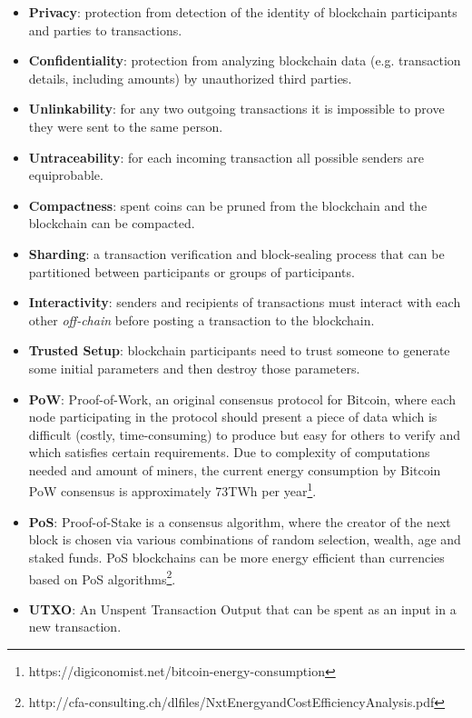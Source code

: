 \documentclass[8pt,fleqn,openany]{book}
\begin{document}
\begin{itemize}
  \item \textbf{Privacy}: protection from detection of the identity of blockchain participants and parties to transactions.
  \item \textbf{Confidentiality}: protection from analyzing blockchain data (e.g. transaction details, including amounts) by unauthorized third parties.
  \item \textbf{Unlinkability}: for any two outgoing transactions it is impossible to prove they were sent to the same person\cite{c2}.
  \item \textbf{Untraceability}: for each incoming transaction all possible senders are equiprobable\cite{c2}.
  \item \textbf{Compactness}: spent coins can be pruned from the blockchain and the blockchain can be compacted.
  \item \textbf{Sharding}: a transaction verification and block-sealing process that can be partitioned between participants or groups of participants.
  \item \textbf{Interactivity}: senders and recipients of transactions must interact with each other \textit{off-chain} before posting a transaction to the blockchain.
  \item \textbf{Trusted Setup}: blockchain participants need to trust someone to generate some initial parameters and then destroy those parameters.
  \item \textbf{PoW}: Proof-of-Work, an original consensus protocol for Bitcoin, where each node participating in the protocol should present a piece of data which is difficult (costly, time-consuming) to produce but easy for others to verify and which satisfies certain requirements. Due to complexity of computations needed and amount of miners, the current energy consumption by Bitcoin PoW consensus is approximately 73TWh per year\footnote{https://digiconomist.net/bitcoin-energy-consumption}.
  \item \textbf{PoS}: Proof-of-Stake is a consensus algorithm, where the creator of the next block is chosen via various combinations of random selection, wealth, age and staked funds. PoS blockchains can be more energy efficient than currencies based on PoS algorithms\footnote{http://cfa-consulting.ch/dlfiles/NxtEnergyandCostEfficiencyAnalysis.pdf}.
  \item \textbf{UTXO}: An Unspent Transaction Output that can be spent as an input in a new transaction.
\end{itemize}
\end{document}
